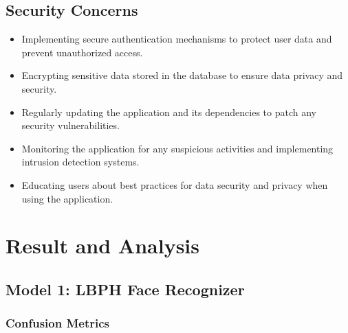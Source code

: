 \documentclass[openany]{report}
\begin{document}
\section{Security Concerns}
\begin{itemize}
    \item Implementing secure authentication mechanisms to protect user data and prevent unauthorized access.
    \item Encrypting sensitive data stored in the database to ensure data privacy and security.
    \item Regularly updating the application and its dependencies to patch any security vulnerabilities.
    \item Monitoring the application for any suspicious activities and implementing intrusion detection systems.
    \item Educating users about best practices for data security and privacy when using the application.
\end{itemize}

\chapter{Result and Analysis}
\section{Model 1: LBPH Face Recognizer}
\subsection{Confusion Metrics}
\end{document}
